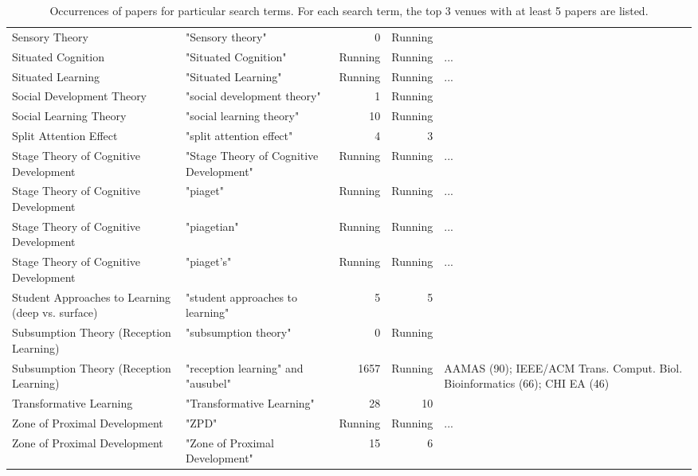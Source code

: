 \begin{table*}[t]
\begin{tabular}{p{4cm}p{6cm}rrp{3cm}}
Sensory Theory & "Sensory theory" & 0 & Running &  \\
Situated Cognition & "Situated Cognition" & Running & Running & ... \\
Situated Learning & "Situated Learning" & Running & Running & ... \\
Social Development Theory & "social development theory" & 1 & Running &  \\
Social Learning Theory & "social learning theory" & 10 & Running &  \\
Split Attention Effect & "split attention effect" & 4 & 3 &  \\
Stage Theory of Cognitive Development & "Stage Theory of Cognitive Development" & Running & Running & ... \\
Stage Theory of Cognitive Development & "piaget" & Running & Running & ... \\
Stage Theory of Cognitive Development & "piagetian" & Running & Running & ... \\
Stage Theory of Cognitive Development & "piaget's" & Running & Running & ... \\
Student Approaches to Learning (deep vs. surface) & "student approaches to learning" & 5 & 5 &  \\
Subsumption Theory (Reception Learning) & "subsumption theory" & 0 & Running &  \\
Subsumption Theory (Reception Learning) & "reception learning" and "ausubel" & 1657 & Running & AAMAS  (90); IEEE/ACM Trans. Comput. Biol. Bioinformatics (66); CHI EA  (46) \\
Transformative Learning & "Transformative Learning" & 28 & 10 &  \\
Zone of Proximal Development & "ZPD" & Running & Running & ... \\
Zone of Proximal Development & "Zone of Proximal Development" & 15 & 6 &  \\
\end{tabular}
\caption{Occurrences of papers for particular search terms. For each search term, the top 3 venues with at least 5 papers are listed.}
\end{table*}